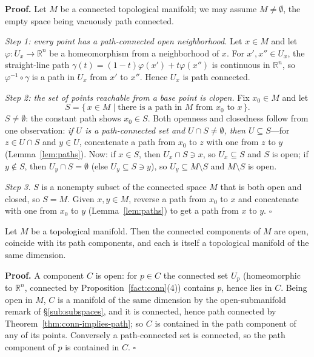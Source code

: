 \documentclass[11pt]{report}
\makeatletter
\newcounter{thmcounter}[section]
\renewenvironment{proof}[1][Proof]{\noindent\textbf{#1.} }{\hfill$\square$\par\vspace{5pt}}
\newcommand{\thmlabel}[1]{\edef\@currentlabel{\arabic{section}.\arabic{thmcounter}}\label{#1}}
\newcommand{\leeref}[1]{\par\smallskip{\raggedleft\footnotesize\textsc{Lee}:\ #1\par}}
\makeatother
\begin{document}
\begin{proof}
Let $M$ be a connected topological manifold; we may assume $M \neq \emptyset$, the empty space being vacuously path connected.

\emph{Step 1: every point has a path-connected open neighborhood.} Let $x \in M$ and let $\varphi : U_x \to \mathbb{R}^n$ be a homeomorphism from a neighborhood of $x$. For $x', x'' \in U_x$, the straight-line path $\gamma(t) = (1-t)\varphi(x') + t\varphi(x'')$ is continuous in $\mathbb{R}^n$, so $\varphi^{-1} \circ \gamma$ is a path in $U_x$ from $x'$ to $x''$. Hence $U_x$ is path connected.

\emph{Step 2: the set of points reachable from a base point is clopen.} Fix $x_0 \in M$ and let
\[
S = \{\, x \in M \mid \text{there is a path in } M \text{ from } x_0 \text{ to } x \,\}.
\]
$S \neq \emptyset$: the constant path shows $x_0 \in S$. Both openness and closedness follow from one observation: \emph{if $U$ is a path-connected set and $U \cap S \neq \emptyset$, then $U \subseteq S$}---for $z \in U \cap S$ and $y \in U$, concatenate a path from $x_0$ to $z$ with one from $z$ to $y$ (Lemma~\ref{lem:paths}). Now: if $x \in S$, then $U_x \cap S \ni x$, so $U_x \subseteq S$ and $S$ is open; if $y \notin S$, then $U_y \cap S = \emptyset$ (else $U_y \subseteq S \ni y$), so $U_y \subseteq M \setminus S$ and $M \setminus S$ is open.

\emph{Step 3.} $S$ is a nonempty subset of the connected space $M$ that is both open and closed, so $S = M$. Given $x, y \in M$, reverse a path from $x_0$ to $x$ and concatenate with one from $x_0$ to $y$ (Lemma~\ref{lem:paths}) to get a path from $x$ to $y$.
\end{proof}

\begin{corbox}\thmlabel{cor:manifold-components}
Let $M$ be a topological manifold. Then the connected components of $M$ are open, coincide with its path components, and each is itself a topological manifold of the same dimension.
\leeref{Proposition 1.11(c) and (d)}
\end{corbox}

\begin{proof}
A component $C$ is open: for $p \in C$ the connected set $U_p$ (homeomorphic to $\mathbb{R}^n$, connected by Proposition~\ref{fact:conn}(4)) contains $p$, hence lies in $C$. Being open in $M$, $C$ is a manifold of the same dimension by the open-submanifold remark of \S\ref{sub:subspaces}, and it is connected, hence path connected by Theorem~\ref{thm:conn-implies-path}; so $C$ is contained in the path component of any of its points. Conversely a path-connected set is connected, so the path component of $p$ is contained in $C$.
\end{proof}
\end{document}
